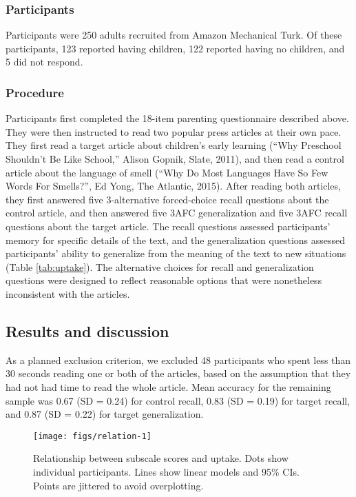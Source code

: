 \documentclass[10pt, letterpaper]{article}
\newenvironment{CodeChunk}{}{}
\begin{document}
\subsubsection{Participants}\label{participants}

Participants were 250 adults recruited from Amazon Mechanical Turk. Of
these participants, 123 reported having children, 122 reported having no
children, and 5 did not respond.

\subsubsection{Procedure}\label{procedure}

Participants first completed the 18-item parenting questionnaire
described above. They were then instructed to read two popular press
articles at their own pace. They first read a target article about
children's early learning (``Why Preschool Shouldn't Be Like School,''
Alison Gopnik, Slate, 2011), and then read a control article about the
language of smell (``Why Do Most Languages Have So Few Words For
Smells?'', Ed Yong, The Atlantic, 2015). After reading both articles,
they first answered five 3-alternative forced-choice recall questions
about the control article, and then answered five 3AFC generalization
and five 3AFC recall questions about the target article. The recall
questions assessed participants' memory for specific details of the
text, and the generalization questions assessed participants' ability to
generalize from the meaning of the text to new situations (Table
\ref{tab:uptake}). The alternative choices for recall and generalization
questions were designed to reflect reasonable options that were
nonetheless inconsistent with the articles.

\subsection{Results and discussion}\label{results-and-discussion}

As a planned exclusion criterion, we excluded 48 participants who spent
less than 30 seconds reading one or both of the articles, based on the
assumption that they had not had time to read the whole article. Mean
accuracy for the remaining sample was 0.67 (SD = 0.24) for control
recall, 0.83 (SD = 0.19) for target recall, and 0.87 (SD = 0.22) for
target generalization.

\begin{CodeChunk}
\begin{figure*}[t]

{\centering \texttt{[image: figs/relation-1]} 

}

\caption[Relationship between subscale scores and uptake]{Relationship between subscale scores and uptake. Dots show individual participants. Lines show linear models and 95\% CIs. Points are jittered to avoid overplotting.}\label{fig:relation}
\end{figure*}
\end{CodeChunk}
\end{document}
